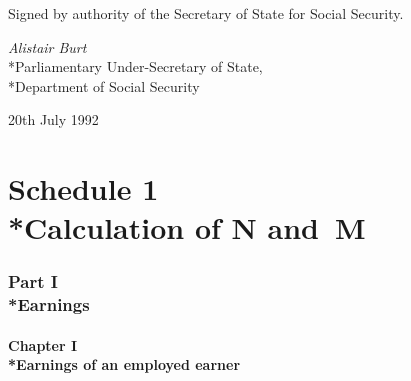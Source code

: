 \documentclass[12pt,a4paper]{article}
\begin{document}
\bigskip

Signed by authority of the Secretary of State for Social Security.

{\raggedleft
\emph{Alistair Burt}\\*Parliamentary Under-Secretary of State,\\*Department of Social Security

}

20th July 1992

\small

\part[Schedule 1 --- Calculation of N and~M]{Schedule 1\\*Calculation of N and~M}

\section[Part I --- Earnings]{Part I\\*Earnings}

\subsection[Chapter I --- Earnings of an employed earner]{Chapter I\\*Earnings of an employed earner}

\renewcommand\parthead{--- Schedule 1 Part I Chapter I}
\end{document}
